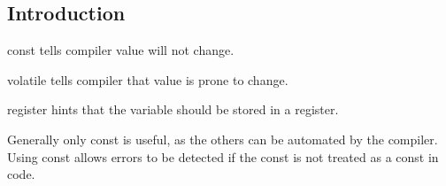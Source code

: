 
\subsection{Introduction}

const tells compiler value will not change.

volatile tells compiler that value is prone to change.

register hints that the variable should be stored in a register.

Generally only const is useful, as the others can be automated by the compiler. Using const allows errors to be detected if the const is not treated as a const in code.
